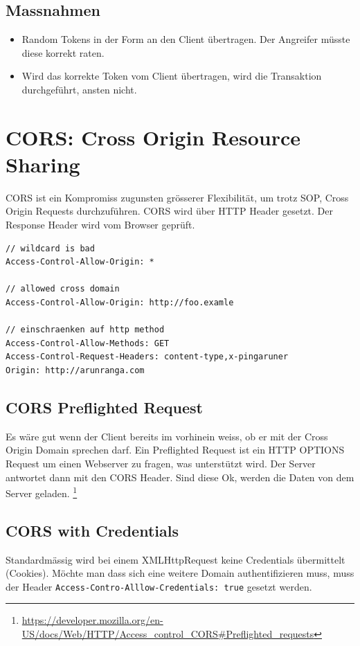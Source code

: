 \subsection{Massnahmen}
\begin{itemize}
	\item Random Tokens in der Form an den Client übertragen. Der Angreifer müsste diese korrekt raten.
	\item Wird das korrekte Token vom Client übertragen, wird die Transaktion durchgeführt, ansten nicht.
\end{itemize}

\section{CORS: Cross Origin Resource Sharing}
CORS ist ein Kompromiss zugunsten grösserer Flexibilität, um trotz SOP, Cross Origin Requests durchzuführen. CORS wird über HTTP Header gesetzt. Der Response Header wird vom Browser geprüft.
\begin{lstlisting}
// wildcard is bad
Access-Control-Allow-Origin: *

// allowed cross domain
Access-Control-Allow-Origin: http://foo.examle

// einschraenken auf http method
Access-Control-Allow-Methods: GET
Access-Control-Request-Headers: content-type,x-pingaruner
Origin: http://arunranga.com
\end{lstlisting}

\subsection{CORS Preflighted Request}
Es wäre gut wenn der Client bereits im vorhinein weiss, ob er mit der Cross Origin Domain sprechen darf. Ein Preflighted Request ist ein HTTP OPTIONS Request um einen Webserver zu fragen, was unterstützt wird. Der Server antwortet dann mit den CORS Header. Sind diese Ok, werden die Daten von dem Server geladen. \footnote{\url{https://developer.mozilla.org/en-US/docs/Web/HTTP/Access\_control\_CORS\#Preflighted\_requests}}

\subsection{CORS with Credentials}
Standardmässig wird bei einem XMLHttpRequest keine Credentials übermittelt (Cookies). Möchte man dass sich eine weitere Domain authentifizieren muss, muss der Header \lstinline|Access-Contro-Alllow-Credentials: true| gesetzt werden. 


